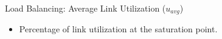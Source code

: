 \begin{frame}[t]{Load Balancing: Average Link Utilization ($u_{avg}$)}
\begin{itemize}
\item Percentage of link utilization at the saturation point.%
\end{itemize}

\end{frame}